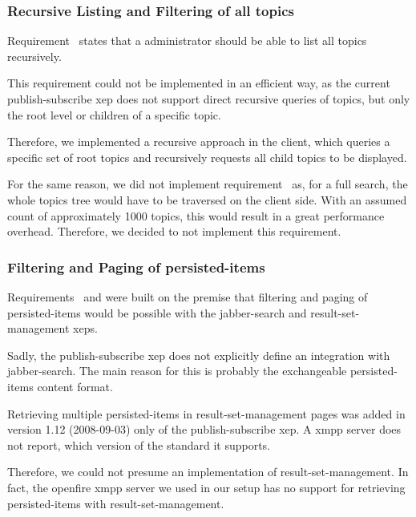 \subsubsection{Recursive Listing and Filtering of all \glspl{topic}}

Requirement~ states that a administrator should be able to list all topics recursively.

This requirement could not be implemented in an efficient way, as the current \gls{publish-subscribe} \gls{xep} does not support direct recursive queries of \glspl{topic}, but only the root level or children of a specific \gls{topic}.

Therefore, we implemented a recursive approach in the client, which queries a specific set of root \glspl{topic} and recursively requests all child \glspl{topic} to be displayed.

For the same reason, we did not implement requirement~ as, for a full search, the whole \glspl{topic} tree would have to be traversed on the client side.
With an assumed count of approximately 1000 \glspl{topic}, this would result in a great performance overhead. Therefore, we decided to not implement this requirement.

\subsubsection{Filtering and Paging of \glspl{persisted-item}}

Requirements~ and  were built on the premise that filtering and paging of \glspl{persisted-item} would be possible with the \gls{jabber-search} \cite{xep-0055} and \gls{result-set-management} \cite{xep-0059} \glspl{xep}.

Sadly, the \gls{publish-subscribe} \gls{xep} does not explicitly define an integration with \gls{jabber-search}.
The main reason for this is probably the exchangeable \glspl{persisted-item} content format.

Retrieving multiple \glspl{persisted-item} in \gls{result-set-management} pages was added in version 1.12 (2008-09-03) only of the \gls{publish-subscribe} \gls{xep}.
A \gls{xmpp} server does not report, which version of the standard it supports.

Therefore, we could not presume an implementation of \gls{result-set-management}.
In fact, the openfire \gls{xmpp} server we used in our setup has no support for retrieving \glspl{persisted-item} with \gls{result-set-management}.

